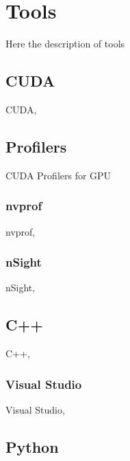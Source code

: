 \chapter{Tools} \label{chap:tools}
Here the description of tools
\section{CUDA}
CUDA,
\section{Profilers}
	CUDA Profilers for GPU 
	\subsection{nvprof}
	 nvprof,
	\subsection{nSight}
	 nSight,
\section{C++}
	C++, 
	\subsection{Visual Studio}
		 Visual Studio,
 \section{Python}

